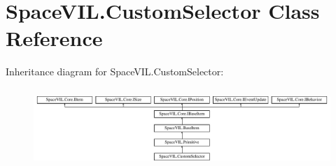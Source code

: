 \hypertarget{class_space_v_i_l_1_1_custom_selector}{}\section{Space\+V\+I\+L.\+Custom\+Selector Class Reference}
\label{class_space_v_i_l_1_1_custom_selector}
Inheritance diagram for Space\+V\+I\+L.\+Custom\+Selector\+:\begin{figure}[H]
\begin{center}
\leavevmode
\includegraphics[height=3.027027cm]{class_space_v_i_l_1_1_custom_selector}
\end{center}
\end{figure}
